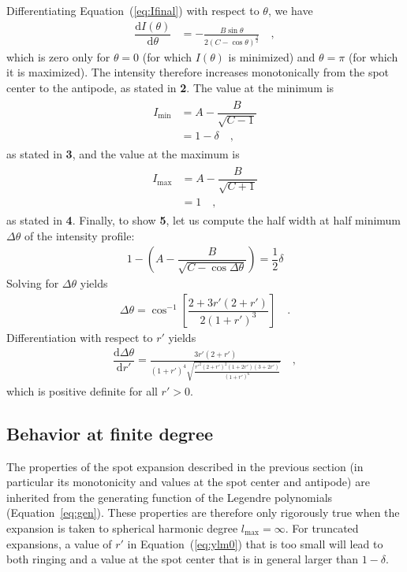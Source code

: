 \documentclass[modern]{aastex62}
\begin{document}
Differentiating Equation~(\ref{eq:Ifinal}) with respect to $\theta$, we have
%
\begin{align}
    \label{eq:Ideriv}
    \dfrac{\mathrm{d}I(\theta)}{\mathrm{d}\theta} & =
    -\frac{B\sin\theta}{2(C - \cos\theta)^\frac{3}{2}}
    \quad,
\end{align}
%
which is zero only for $\theta = 0$ (for which $I(\theta)$ is
minimized) and $\theta = \pi$ (for which it is maximized). The intensity
therefore increases monotonically from the spot center to the antipode,
as stated in \textbf{2}. The value at the minimum is
%
\begin{align}
    \begin{split}
        I_{\mathrm{min}} & = A - \dfrac{B}{\sqrt{C - 1}} \\
        & = 1 - \delta
        \quad,
    \end{split}
\end{align}
%
as stated in \textbf{3}, and the value at the maximum is
%
\begin{align}
    \begin{split}
        I_{\mathrm{max}} & = A - \dfrac{B}{\sqrt{C + 1}} \\
        & = 1
        \quad,
    \end{split}
\end{align}
%
as stated in \textbf{4}.
Finally, to show \textbf{5}, let us compute the half width at half minimum
$\Delta\theta$ of the intensity profile:
%
\begin{align}
    1 - \left(A - \dfrac{B}{\sqrt{C - \cos{\Delta\theta}}}\right) =
    \dfrac{1}{2}\delta
\end{align}
%
Solving for $\Delta\theta$ yields
%
\begin{align}
    \label{eq:hwhm}
    \Delta\theta =
    \cos^{-1} \left[ \dfrac{2 + 3 r' (2 + r')}{2 (1 + r')^3} \right]
    \quad.
\end{align}
%
Differentiation with respect to $r'$ yields
%
\begin{align}
    \dfrac{\mathrm{d}\Delta\theta}{\mathrm{d}r'} =
    \frac{3 r' \left(2 + r'\right)}{\left(1 + r'\right)^4
        \sqrt{\frac{r'^2 \left(2 + r'\right)^2 \left(1 + 2 r'\right)
                \left(3 + 2 r'\right)}{\left(1 + r'\right)^6}}}
    \quad,
\end{align}
%
which is positive definite for all $r' > 0$.

\subsection{Behavior at finite degree}
%
The properties of the spot expansion described in the previous section
(in particular its monotonicity and values at the spot center and antipode)
are inherited from the generating function of the Legendre polynomials
(Equation~\ref{eq:gen}). These properties are therefore only rigorously
true when the expansion is taken to spherical
harmonic degree $l_{\mathrm{max}} = \infty$. For truncated expansions,
a value of $r'$ in Equation~(\ref{eq:ylm0}) that is too small will lead
to both ringing and a value at the spot center that is in general larger
than $1 - \delta$.
\end{document}
